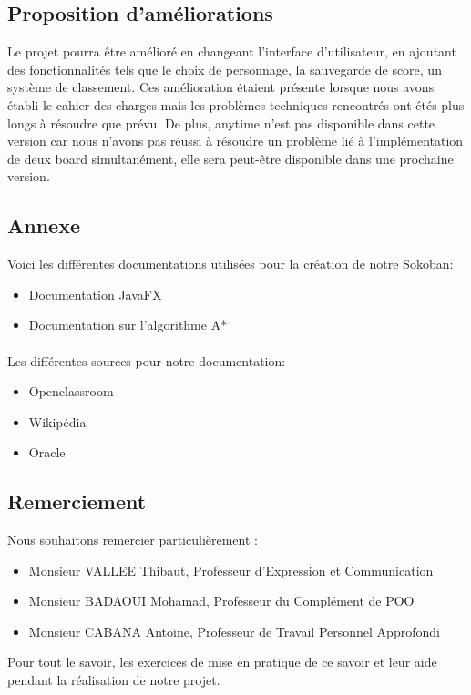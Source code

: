 \documentclass[a4paper,12pt]{article} %
\begin{document}
	\subsection{Proposition d'améliorations}
	Le projet pourra être amélioré en changeant l'interface d'utilisateur, en ajoutant des fonctionnalités tels que le choix de personnage, la sauvegarde de score, un système de classement. Ces amélioration étaient présente lorsque nous avons établi le cahier des charges mais les problèmes techniques rencontrés ont étés plus longs à résoudre que prévu. De plus, anytime n'est pas disponible dans cette version car nous n'avons pas réussi à résoudre un problème lié à l'implémentation de deux board simultanément, elle sera peut-être disponible dans une prochaine version. 

\newpage


\begin{center}
\section{Annexe}
\end{center}
Voici les différentes documentations utilisées pour la création de notre Sokoban:
\begin{itemize}
\item Documentation JavaFX
\item Documentation sur l'algorithme A*
\end{itemize}
\paragraph{}

Les différentes sources pour notre documentation:
\begin{itemize}
\item Openclassroom
\item Wikipédia
\item Oracle
\end{itemize}
\begin{center}
\section{Remerciement}
\end{center}

Nous souhaitons remercier particulièrement : 
\begin{itemize}
\item Monsieur VALLEE Thibaut, Professeur d'Expression et Communication
\item Monsieur BADAOUI Mohamad, Professeur du Complément de POO
\item Monsieur CABANA Antoine, Professeur de Travail Personnel Approfondi
\end{itemize}
Pour tout le savoir, les exercices de mise en pratique de ce savoir et leur aide pendant la réalisation de notre projet.
\end{document}
